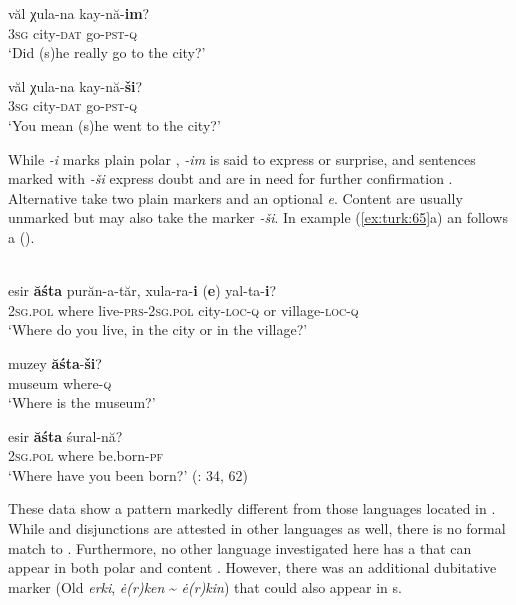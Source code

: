     \ex
    \gll văl  χula-na  kay-nă-\textbf{{im}}?\\
    3\textsc{sg}  city-\textsc{dat}  go-\textsc{pst}-\textsc{q}\\
    \glt ‘Did (s)he really go to the city?’
    
    \ex
    \gll văl  χula-na  kay-nă-\textbf{{ši}}?\\
    3\textsc{sg}  city-\textsc{dat}  go-\textsc{pst}-\textsc{q}\\
    \glt ‘You mean (s)he went to the city?’ \citep[450]{Clark1998}\z\z

While \textit{-i} marks plain polar , \textit{-im} is said to express  or surprise, and sentences marked with \textit{-ši} express doubt and are in need for further confirmation \citep[450]{Clark1998}. Alternative  take two plain  markers and an optional  \textit{e}. Content  are usually unmarked but may also take the marker \textit{-ši}. In example (\ref{ex:turk:65}a) an  follows a  ().

\ea%
    \label{ex:turk:65}
    \\
    \ea
    \gll esir \textbf{{ăśta}} purăn-a-tăr,    xula-ra-\textbf{{i}} (\textbf{{e}}) yal-ta-\textbf{{i}}?\\
    2\textsc{sg.pol}  where  live-\textsc{prs}-2\textsc{sg.pol}  city-\textsc{loc}-\textsc{q}  or village-\textsc{loc}-\textsc{q}\\
    \glt ‘Where do you live, in the city or in the village?’
    
    \ex
    \gll muzey \textbf{{ăśta}}-\textbf{{ši}}?\\
    museum  where-\textsc{q}\\
    \glt ‘Where is the museum?’
    
    \ex
    \gll esir \textbf{{ăśta}} śural-nă?\\
    2\textsc{sg.pol}  where  be.born-\textsc{pf}\\
    \glt ‘Where have you been born?’ (\citealt{Landmann2014}: 34, 62)\z\z

These data show a pattern markedly different from those  languages located in . While  and disjunctions are attested in other  languages as well, there is no formal match to . Furthermore, no other  language investigated here has a  that can appear in both polar and content . However, there was an additional dubitative marker (Old  \textit{erki},  \textit{\.e(r)ken} {\textasciitilde} \textit{\.e(r)kin}) that could also appear in s.

